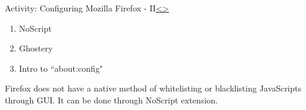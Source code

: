 \documentclass[12pt]{extarticle}
\newenvironment{instructionblock}{\Large\bgroup}{\egroup}
\begin{document}
	
	\pagebreak
	\begin{slide}{Activity: Configuring Mozilla Firefox - II}{\hyperref[slide 13]{\textless}\hyperref[slide 15]{\textgreater}}
		\vskip 5pt
		\begin{instructionblock}
			\begin{enumerate}
				\item NoScript
				\item Ghostery
				\item Intro to ``about:config"
			\end{enumerate}
		\end{instructionblock}
	\end{slide}
	\vfill
	
	\vspace{2mm}
	\noindent
	Firefox does not have a native method of whitelisting or blacklisting JavaScripts through GUI. It can be done through NoScript extension.
	
\end{document}
